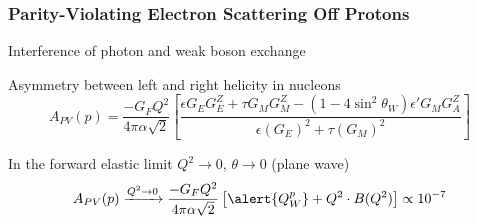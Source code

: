 \begin{frame}[t]
 \frametitle{Parity-Violating Electron Scattering Off Protons}
 \begin{block}{Interference of photon and weak boson exchange}
  \centerline{}
 \end{block}
 \begin{block}{Asymmetry between left and right helicity in nucleons}
  \abovedisplayskip=0pt
  \begin{equation*}
   A_{PV}(p) = \frac{-G_F Q^2}{4 \pi \alpha \sqrt{2}} \left[ \frac{\epsilon G_E G^Z_E + \tau G_M G^Z_M - (1 - 4 \sin^2 \theta_W) \epsilon' G_M G^Z_A}{\epsilon (G_E)^2 + \tau (G_M)^2} \right]
  \end{equation*}
 \end{block}
 \begin{block}{In the \alert{forward elastic limit $Q^2 \to 0$}, $\theta \to 0$ (plane wave)}
  \begin{equation*}
   A_{PV}(p) \xrightarrow{Q^2 \to 0} \frac{-G_F Q^2}{4 \pi \alpha \sqrt{2}} \left[ \alert{Q^p_W} + Q^2 \cdot B(Q^2) \right] \propto 10^{-7}
  \end{equation*}
 \end{block}
\end{frame}
